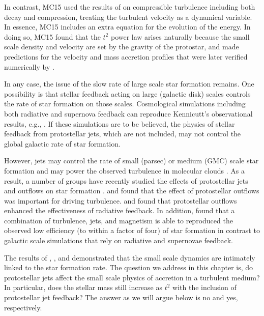 \documentclass[../dissertation.tex]{subfiles}
\begin{document}
In contrast,  MC15 used the results of \citet{2012ApJ...750L..31R} on compressible turbulence including both decay and compression, treating the turbulent velocity as a dynamical variable.  In essence, MC15 includes an extra equation for the evolution of the energy.
In doing so, MC15 found that the $t^2$ power law arises naturally because the small scale density and velocity are set by the gravity of the protostar, and made predictions for the velocity and mass accretion profiles that were later verified numerically by \citet{2017MNRAS.465.1316M}.

In any case, the issue of the slow rate of large scale star formation remains.
One possibility is that stellar feedback acting on large (galactic disk) scales controls the rate of star formation on those scales.
Cosmological simulations including both radiative and supernova feedback can reproduce Kennicutt's observational results, e.g., \cite{2011MNRAS.417..950H,2013ApJ...770...25A,2014MNRAS.445..581H}. If these simulations are to be believed, the physics of stellar feedback from protostellar jets, which are not included, may not control the global galactic rate of star formation.

However, jets may control the rate of small (parsec) or medium (GMC) scale star formation and may power the observed turbulence in molecular clouds \citep{2007ApJ...659.1394M}.
As a result, a number of groups have recently studied the effects of protostellar jets and outflows on star formation \citep{2010ApJ...709...27W,2014MNRAS.439.3420M,2015MNRAS.450.4035F}.
\citet{2007ApJ...662..395N} and \citet{2011ApJ...740...36N} found that the effect of protostellar outflows was important for driving turbulence.  \citet{2011ApJ...740..107C} and \citet{2012ApJ...747...22H} found that protostellar outflows enhanced the effectiveness of radiative feedback.  In addition, \citet{2015MNRAS.450.4035F} found that a combination of turbulence, jets, and magnetism is able to reproduced the observed low efficiency (to within a factor of four) of star formation in contrast to galactic scale simulations that rely on radiative and supernovae feedback.

The results of \citet{2015ApJ...800...49L}, \citet{2015ApJ...804...44M}, and \citet{2017MNRAS.465.1316M} demonstrated that the small scale dynamics are intimately linked to the star formation rate. 
The question we address in this chapter is, do protostellar jets affect the small scale physics of accretion in a turbulent medium? 
In particular, does the stellar mass still increase as $t^2$ with the inclusion of protostellar jet feedback? 
The answer as we will argue below is no and yes, respectively.
\end{document}
